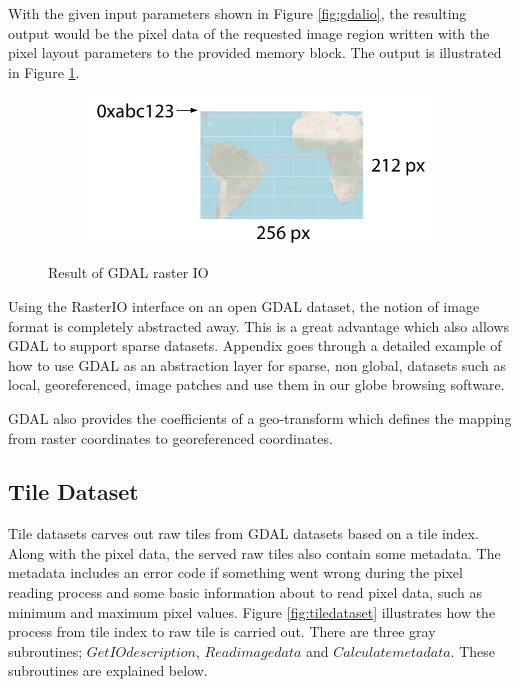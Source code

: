 With the given input parameters shown in Figure \ref{fig:gdalio}, the resulting output would be the pixel data of the requested image region written with the pixel layout parameters to the provided memory block. The output is illustrated in Figure \ref{fig:gdalioresult}.

\begin{figure}[htbp]
    \centering
    \begin{subfigure}[bt]{0.5\textwidth}
        \includegraphics[width=\textwidth]{figures/implementation/pipeline/gdalioresult.pdf}
    \end{subfigure}
    \caption{Result of GDAL raster IO}
    \label{fig:gdalioresult}
\end{figure}

Using the RasterIO interface on an open GDAL dataset, the notion of image format is completely abstracted away. This is a great advantage which also allows GDAL to support sparse datasets. Appendix  goes through a detailed example of how to use GDAL as an abstraction layer for sparse, non global, datasets such as local, georeferenced, image patches and use them in our globe browsing software.

GDAL also provides the coefficients of a geo-transform which defines the mapping from raster coordinates to georeferenced coordinates.

\subsection{Tile Dataset}
Tile datasets carves out raw tiles from GDAL datasets based on a tile index. Along with the pixel data, the served raw tiles also contain some metadata. The metadata includes an error code if something went wrong during the pixel reading process and some basic information about to read pixel data, such as minimum and maximum pixel values. Figure \ref{fig:tiledataset} illustrates how the process from tile index to raw tile is carried out. There are three gray subroutines; $Get IO description$, $Read image data$ and $Calculate metadata$. These subroutines are explained below.

